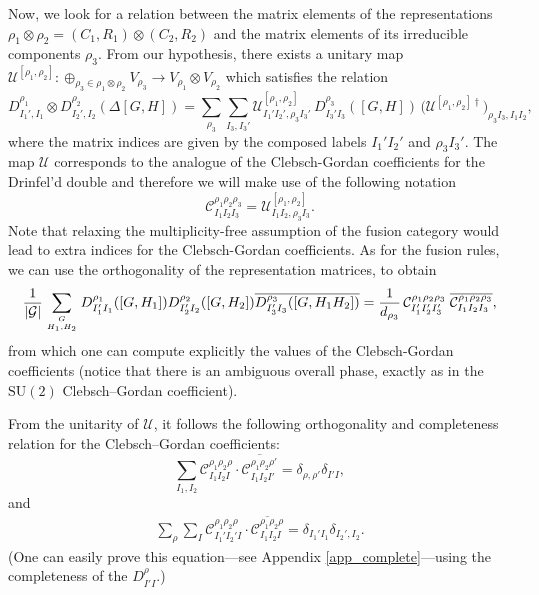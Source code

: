\documentclass[nofootinbib,superscriptaddress,eqsecnum,tightenlines,11pt]{revtex4-1}
\def\SU{\text{SU}}
\def\be{\begin{equation}}
\def\ee{\end{equation}}
\begin{document}
Now, we look for a relation between the matrix elements of the representations $\rho_1 \otimes\rho_2 = (C_1,R_1)\otimes(C_2,R_2)$ and the matrix elements of its irreducible components $\rho_3$.
From our hypothesis, there exists a unitary map $\mathcal{U}^{[\rho_1,\rho_2] }: \oplus_{\rho_3 \in \rho_1\otimes \rho_2} V_{\rho_3}\rightarrow V_{\rho_1} \otimes V_{\rho_2}$ which satisfies the relation
\be\label{CG0}
	D^{\rho_1}_{I_1',I_1} \otimes D^{\rho_2}_{I_2',I_2}(\Delta[G,H])
	=  \sum_{\rho_3}\sum_{I_3, I_3'}
	\mathcal{U}^{[\rho_1,\rho_2]}_{I_1'I_2',\rho_3I_3'}\,
	D^{\rho_3}_{I_3'I_3}([G,H])\,
	({\mathcal{U}^{[\rho_1,\rho_2] \dagger}) _{\rho_3I_3,I_1I_2}},
\ee
where the matrix indices are given by the composed labels $I_1'I_2'$ and $\rho_3I_3'$. 
The map $\mathcal{U}$ corresponds to the analogue of the Clebsch-Gordan coefficients for the Drinfel'd double and therefore we will make use of the following notation
\be
	\mathcal{C}^{\rho_1 \rho_2\rho_3}_{I_1 I_2 I_3} = 
	\mathcal{U}^{[\rho_1 ,\rho_2]}_{I_1 I_2,\rho_3I_3}.
\ee
{ Note that relaxing the multiplicity-free assumption of the fusion category would lead to extra indices for the Clebsch-Gordan coefficients}.
As for the fusion rules, we can use the orthogonality of the representation matrices, to obtain
\begin{align}
 	\frac{1}{|\mathcal{G}|}\sum_{G \atop H_1,H_2 }D^{\rho_1}_{I_1'I_1}([G,H_1]) D^{\rho_2}_{I_2'I_2}([G,H_2]) 
	\overline{D^{\rho_3}_{I_3'I_3}([G,H_1 H_2])}
	 = \frac{1}{d_{\rho_3}}\,
	\mathcal{C}^{\rho_1 \rho_2\rho_3}_{I_1' I_2' I_3'}\;
	\overline{\mathcal{C}^{\rho_1 \rho_2\rho_3}_{I_1 I_2 I_3}} \label{defCGcoeffs},
\end{align}
from which one can compute explicitly the values of the Clebsch-Gordan coefficients (notice that there is an ambiguous overall phase, exactly as in the $\SU(2)$ Clebsch--Gordan coefficient).

From the unitarity of $\mathcal{U}$, it follows the following orthogonality and completeness relation for the Clebsch--Gordan coefficients:
\be
	\sum_{I_1,I_2}
	\mathcal{C}^{\rho_1 \rho_2\rho}_{I_1 I_2 I} \cdot
	\overline{\mathcal{C}^{\rho_1 \rho_2\rho'}_{I_1 I_2 I'}}
	 = \delta_{\rho,\rho'}\delta_{I'I} \label{orthoW3J},
\ee
and
\begin{align}
	\sum_{\rho}\sum_I
\mathcal{C}^{\rho_1 \rho_2\rho}_{I_1' I_2' I} \cdot
\overline{\mathcal{C}^{\rho_1 \rho_2\rho}_{I_1 I_2 I}} 
= \delta_{I_1'I_1}\delta_{I_2',I_2} .
	\label{resolutionCC}
\end{align}
(One can easily prove this equation---see Appendix \ref{app_complete}---using the completeness of the $D^\rho_{I'I}$.)
\end{document}
